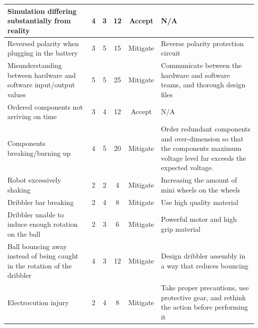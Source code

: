 \begin{longtable}{|p{}|c|c|c|c|p{}|}
    \hline
    \endfoot
    Simulation differing substantially from reality                                                                         & 4 & 3 & 12  & Accept   & N/A \\ \hline
    Reversed polarity when plugging in the battery                                                                          & 3 & 5 & 15 & Mitigate & Reverse polarity protection circuit \\ \hline
    Misunderstanding between hardware and software input/output values                                                      & 5 & 5 & 25 & Mitigate & Communicate between the hardware and software teams, and thorough design files \\ \hline
    Ordered components not arriving on time                                                                                 & 3 & 4 & 12 & Accept   & N/A \\ \hline
    Components breaking/burning up                                                                                          & 4 & 5 & 20 & Mitigate & Order redundant components and over-dimension so that the components maximum voltage level far exceeds the expected voltage.\\ \hline
    Robot excessively shaking                                                                                               & 2 & 2 & 4 & Mitigate & Increasing the amount of mini wheels on the wheels \\ \hline
    Dribbler bar breaking                                                                                                   & 2 & 4 & 8  & Mitigate & Use high quality material \\ \hline
    Dribbler unable to induce enough rotation on the ball                                                                   & 2 & 3 & 6  & Mitigate & Powerful motor and high grip material \\ \hline
    Ball bouncing away instead of being caught in the rotation of the dribbler                                              & 4 & 3 & 12 & Mitigate & Design dribbler assembly in a way that reduces bouncing \\ \hline
    Electrocution injury                                                                                                    & 2 & 4 & 8  & Mitigate & Take proper precautions, use protective gear, and rethink the action before performing it \\ \hline

\end{longtable}
